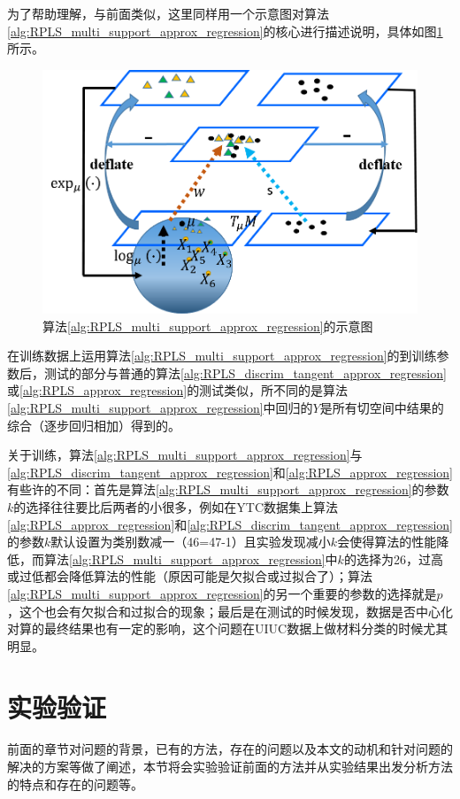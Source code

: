 为了帮助理解，与前面类似，这里同样用一个示意图对算法\ref{alg:RPLS_multi_support_approx_regression}的核心进行描述说明，具体如图\ref{fig:multi_discrim_tangent_PLS}所示。
\begin{figure}[bht]
	\centering
	\includegraphics[width=0.7\linewidth]{source/multi_discrim_tangent_PLS.png}
	\caption{算法\ref{alg:RPLS_multi_support_approx_regression}的示意图}
	\label{fig:multi_discrim_tangent_PLS}
\end{figure}

在训练数据上运用算法\ref{alg:RPLS_multi_support_approx_regression}的到训练参数后，测试的部分与普通的算法\ref{alg:RPLS_discrim_tangent_approx_regression}或\ref{alg:RPLS_approx_regression}的测试类似，所不同的是算法\ref{alg:RPLS_multi_support_approx_regression}中回归的$Y$是所有切空间中结果的综合（逐步回归相加）得到的。

关于训练，算法\ref{alg:RPLS_multi_support_approx_regression}与\ref{alg:RPLS_discrim_tangent_approx_regression}和\ref{alg:RPLS_approx_regression}有些许的不同：首先是算法\ref{alg:RPLS_multi_support_approx_regression}的参数$k$的选择往往要比后两者的小很多，例如在YTC\cite{Database_YTC}数据集上算法\ref{alg:RPLS_approx_regression}和\ref{alg:RPLS_discrim_tangent_approx_regression}的参数$k$默认设置为类别数减一（46=47-1）且实验发现减小$k$会使得算法的性能降低，而算法\ref{alg:RPLS_multi_support_approx_regression}中$k$的选择为26，过高或过低都会降低算法的性能（原因可能是欠拟合或过拟合了）；算法\ref{alg:RPLS_multi_support_approx_regression}的另一个重要的参数的选择就是$p$，这个也会有欠拟合和过拟合的现象；最后是在测试的时候发现，数据是否中心化对算的最终结果也有一定的影响，这个问题在UIUC\cite{Database_UIUC}数据上做材料分类的时候尤其明显。
\section{实验验证}
\label{sec:RPLS_exp}
前面的章节对问题的背景，已有的方法，存在的问题以及本文的动机和针对问题的解决的方案等做了阐述，本节将会实验验证前面的方法并从实验结果出发分析方法的特点和存在的问题等。

